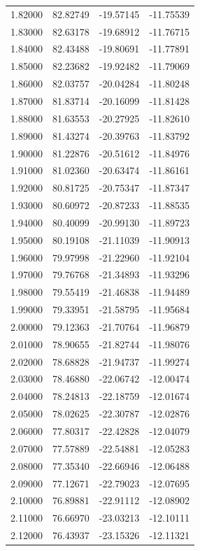 \begin{table}
\begin{tabular}{llll}
1.82000 & 82.82749 & -19.57145 & -11.75539 \\
1.83000 & 82.63178 & -19.68912 & -11.76715 \\
1.84000 & 82.43488 & -19.80691 & -11.77891 \\
1.85000 & 82.23682 & -19.92482 & -11.79069 \\
1.86000 & 82.03757 & -20.04284 & -11.80248 \\
1.87000 & 81.83714 & -20.16099 & -11.81428 \\
1.88000 & 81.63553 & -20.27925 & -11.82610 \\
1.89000 & 81.43274 & -20.39763 & -11.83792 \\
1.90000 & 81.22876 & -20.51612 & -11.84976 \\
1.91000 & 81.02360 & -20.63474 & -11.86161 \\
1.92000 & 80.81725 & -20.75347 & -11.87347 \\
1.93000 & 80.60972 & -20.87233 & -11.88535 \\
1.94000 & 80.40099 & -20.99130 & -11.89723 \\
1.95000 & 80.19108 & -21.11039 & -11.90913 \\
1.96000 & 79.97998 & -21.22960 & -11.92104 \\
1.97000 & 79.76768 & -21.34893 & -11.93296 \\
1.98000 & 79.55419 & -21.46838 & -11.94489 \\
1.99000 & 79.33951 & -21.58795 & -11.95684 \\
2.00000 & 79.12363 & -21.70764 & -11.96879 \\
2.01000 & 78.90655 & -21.82744 & -11.98076 \\
2.02000 & 78.68828 & -21.94737 & -11.99274 \\
2.03000 & 78.46880 & -22.06742 & -12.00474 \\
2.04000 & 78.24813 & -22.18759 & -12.01674 \\
2.05000 & 78.02625 & -22.30787 & -12.02876 \\
2.06000 & 77.80317 & -22.42828 & -12.04079 \\
2.07000 & 77.57889 & -22.54881 & -12.05283 \\
2.08000 & 77.35340 & -22.66946 & -12.06488 \\
2.09000 & 77.12671 & -22.79023 & -12.07695 \\
2.10000 & 76.89881 & -22.91112 & -12.08902 \\
2.11000 & 76.66970 & -23.03213 & -12.10111 \\
2.12000 & 76.43937 & -23.15326 & -12.11321 \\

\end{tabular}
\end{table}
